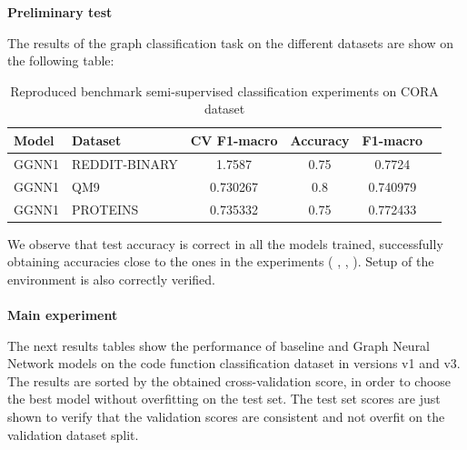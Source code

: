 \textbf{Preliminary test}

The results of the graph classification task on the different datasets are show on the following table:


\begin{table}[H]
\centering
\begin{tabular}{|llccc|c}
\hline
    Model &         Dataset &   CV F1-macro &   Accuracy &  F1-macro \\
\hline
  GGNN1 &   REDDIT-BINARY   &     1.7587    &   0.75 &     0.7724 \\
  GGNN1 &   QM9             &     0.730267  &   0.8 &      0.740979 \\
  GGNN1 &   PROTEINS        &     0.735332    &   0.75 &   0.772433 \\
\hline
\end{tabular}
\label{preliminar_GN}\caption{Reproduced benchmark semi-supervised classification experiments on CORA dataset }
\end{table}

We observe that test accuracy is correct in all the models trained, successfully obtaining accuracies close to the ones in the experiments ( \cite{fey2019fast}, \cite{borgwardt2005protein}, \cite{dobson2003distinguishing}). Setup of the environment is also correctly verified. \\
\\




\textbf{Main experiment}

The next results tables show the performance of baseline  and Graph Neural Network models on the code function classification dataset in versions v1 and v3. The results are sorted by the obtained cross-validation score, in order to choose the best model without overfitting on the test set. The test set scores are just shown to verify that the validation scores are consistent and not overfit on the validation dataset split.






